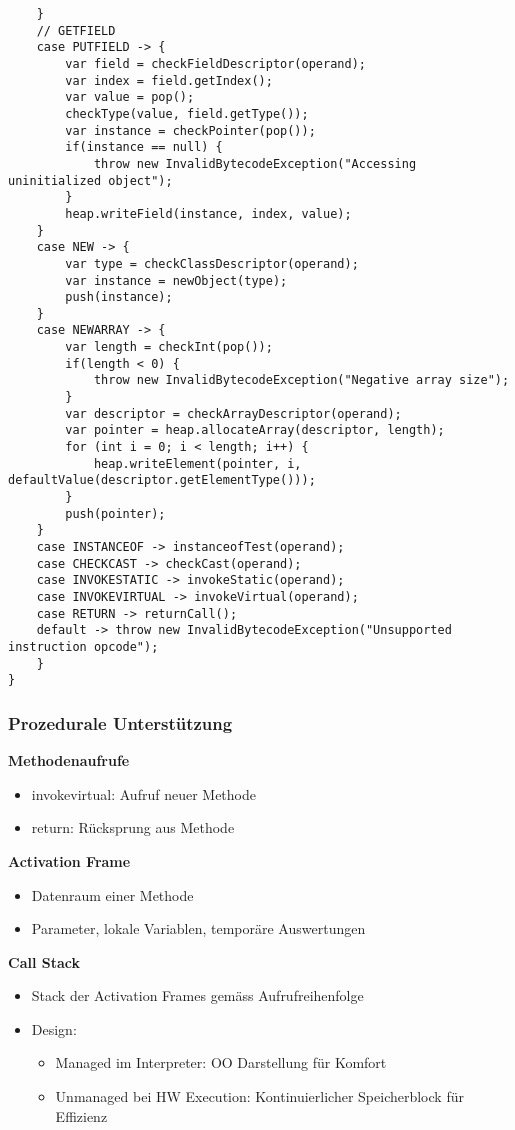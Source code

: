 \begin{lstlisting}
    }
    // GETFIELD
    case PUTFIELD -> {
        var field = checkFieldDescriptor(operand);
        var index = field.getIndex();
        var value = pop();
        checkType(value, field.getType());
        var instance = checkPointer(pop());
        if(instance == null) {
            throw new InvalidBytecodeException("Accessing uninitialized object");
        }
        heap.writeField(instance, index, value);
    }
    case NEW -> {
        var type = checkClassDescriptor(operand);
        var instance = newObject(type);
        push(instance);
    }
    case NEWARRAY -> {
        var length = checkInt(pop());
        if(length < 0) {
            throw new InvalidBytecodeException("Negative array size");
        }
        var descriptor = checkArrayDescriptor(operand);
        var pointer = heap.allocateArray(descriptor, length);
        for (int i = 0; i < length; i++) {
            heap.writeElement(pointer, i, defaultValue(descriptor.getElementType()));
        }
        push(pointer);
    }
    case INSTANCEOF -> instanceofTest(operand);
    case CHECKCAST -> checkCast(operand);
    case INVOKESTATIC -> invokeStatic(operand);
    case INVOKEVIRTUAL -> invokeVirtual(operand);
    case RETURN -> returnCall();
    default -> throw new InvalidBytecodeException("Unsupported instruction opcode");
    }
}
\end{lstlisting}

\subsubsection{Prozedurale Unterstützung}
\textbf{Methodenaufrufe}
\begin{itemize}
    \item invokevirtual: Aufruf neuer Methode
    \item return: Rücksprung aus Methode
\end{itemize}
\textbf{Activation Frame}
\begin{itemize}
    \item Datenraum einer Methode
    \item Parameter, lokale Variablen, temporäre Auswertungen
\end{itemize}
\textbf{Call Stack}
\begin{itemize}
    \item Stack der Activation Frames gemäss Aufrufreihenfolge
    \item Design:
    \begin{itemize}
        \item Managed im Interpreter: OO Darstellung für Komfort
        \item Unmanaged bei HW Execution: Kontinuierlicher Speicherblock für Effizienz
    \end{itemize}
\end{itemize}
